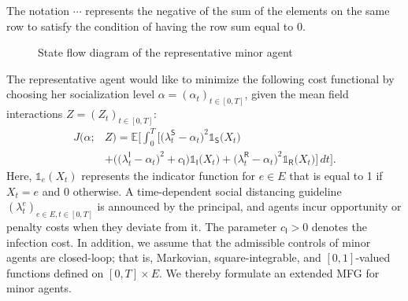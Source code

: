 \documentclass[letterpaper, 10 pt, conference]{ieeeconf}  %
\def\sS{\mathsf{S}}
\def\sI{\mathsf{I}}
\def\sR{\mathsf{R}}
\begin{document}
The notation $\cdots$ represents the negative of the sum of
the elements on the same row to satisfy the condition of
having the row sum equal to 0. 
\begin{figure}[h]
  \centering
{}
\caption{State flow diagram of the representative minor agent}
\label{fig:state_diagram}
\end{figure}
The representative agent would like to minimize the following cost functional by choosing her socialization level $\alpha = (\alpha_t)_{t \in [0,T]}$, given the mean field interactions $Z = (Z_t)_{t \in [0,T]}$:
{\small
\begin{equation}
\label{eq:minor_cost}
\begin{aligned}
J\big(\alpha;&Z\big)
= \mathbb{E}\Big[
\int_{0}^{T} \Big[
\big(\lambda_t^{\sS}-\alpha_t\big)^2\mathds{1}_{\sS}\big(X_t\big) \\
&+ \Big(\big(\lambda_t^{\sI}-\alpha_t\big)^2 + c_{\sI}\Big)\mathds{1}_{\sI}\big(X_t\big)
+ \big(\lambda_t^{\sR}-\alpha_t\big)^2 \mathds{1}_{\sR}\big(X_t\big)
\Big]\,dt
\Big].
\end{aligned}
\end{equation}
}
Here, $\mathds{1}_e\left(X_t\right)$ represents the indicator function for $e \in E$ that is equal to 1 if $X_t=e$ and 0 otherwise. A time-dependent social distancing guideline $\left(\lambda_t^e\right)_{e \in E, t \in[0, T]}$ is announced by the principal, and agents incur opportunity or penalty costs when they deviate from it. The parameter $c_{\sI}>0$ denotes the infection cost. In addition, we assume that the admissible controls of minor agents are closed-loop; that is, Markovian, square-integrable, and $[0,1]$-valued functions defined on $[0,T]\times E$. We thereby formulate an extended MFG for minor agents.
\end{document}
